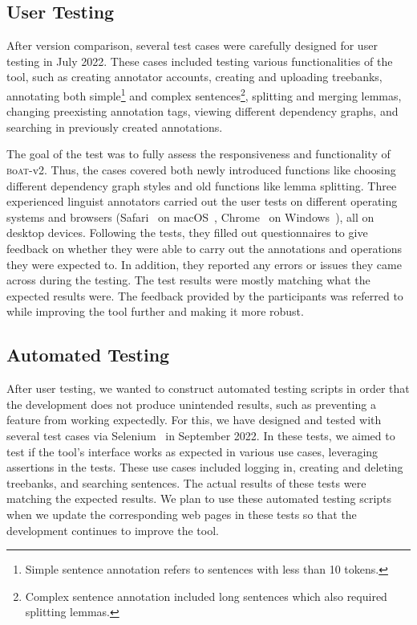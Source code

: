 \documentclass{elektr}
\newcommand{\boatvtwo}{\textsc{b}o\textsc{at}-{\scriptsize v2}}
\begin{document}
\subsection{User Testing}
After version comparison, several test cases were carefully designed for user testing in July 2022.
These cases included testing various functionalities of the tool, such as creating annotator accounts, creating and uploading treebanks, annotating both simple\footnote{Simple sentence annotation refers to sentences with less than 10 tokens.} and complex sentences\footnote{Complex sentence annotation included long sentences which also required splitting lemmas.}, splitting and merging lemmas, changing preexisting annotation tags, viewing different dependency graphs, and searching in previously created annotations.

The goal of the test was to fully assess the responsiveness and functionality of \boatvtwo.
Thus, the cases covered both newly introduced functions like choosing different dependency graph styles and old functions like lemma splitting.
Three experienced linguist annotators carried out the user tests on different operating systems and browsers (Safari~\cite{safari} on macOS~\cite{macos}, Chrome~\cite{chrome} on Windows~\cite{windows}), all on desktop devices.
Following the tests, they filled out questionnaires to give feedback on whether they were able to carry out the annotations and operations they were expected to.
In addition, they reported any errors or issues they came across during the testing.
The test results were mostly matching what the expected results were.
The feedback provided by the participants was referred to while improving the tool further and making it more robust.

\subsection{Automated Testing}
After user testing, we wanted to construct automated testing scripts in order that the development does not produce unintended results, such as preventing a feature from working expectedly.
For this, we have designed and tested with several test cases via Selenium~\cite{selenium} in September 2022.
In these tests, we aimed to test if the tool's interface works as expected in various use cases, leveraging assertions in the tests.
These use cases included logging in, creating and deleting treebanks, and searching sentences.
The actual results of these tests were matching the expected results.
We plan to use these automated testing scripts when we update the corresponding web pages in these tests so that the development continues to improve the tool.
\end{document}
